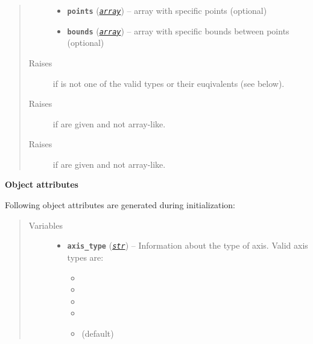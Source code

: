 \documentclass[a4paper,10pt,english]{sphinxmanual}
\begin{document}
\begin{fulllineitems}
\begin{quote}
\begin{description}
\begin{itemize}
\item {} 
\textbf{\texttt{points}} (\href{http://docs.python.org/2.7/library/array.html\#module-array}{\emph{\texttt{array}}}) -- array with specific points (optional)

\item {} 
\textbf{\texttt{bounds}} (\href{http://docs.python.org/2.7/library/array.html\#module-array}{\emph{\texttt{array}}}) -- array with specific bounds between points (optional)

\end{itemize}

\item[{Raises}] \leavevmode
{}
if  is not one of the valid types or 
their euqivalents (see below).

\item[{Raises}] \leavevmode
{}
if  are given and not array-like.

\item[{Raises}] \leavevmode
{}
if  are given and not array-like.

\end{description}\end{quote}

\textbf{Object attributes}

Following object attributes are generated during initialization:
\begin{quote}\begin{description}
\item[{Variables}] \leavevmode\begin{itemize}
\item {} 
\textbf{\texttt{axis\_type}} (\href{http://docs.python.org/2.7/library/functions.html\#str}{\emph{\texttt{str}}}) -- 
Information about the type of axis. Valid axis types are:
\begin{itemize}
\item {} 

\item {} 

\item {} 

\item {} 

\item {} 
 (default)

\end{itemize}



\end{itemize}
\end{description}
\end{quote}
\end{fulllineitems}
\end{document}
